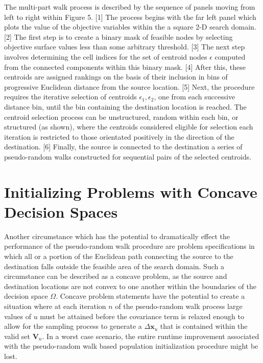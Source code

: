 The multi-part walk process is described by the sequence of panels moving from left to right within Figure 5. [1] The process begins with the far left panel which plots the value of the objective variables within the a square 2-D search domain. [2] The first step is to create a binary mask of feasible nodes by selecting objective surface values less than some arbitrary threshold. [3] The next step involves determining the cell indices for the set of centroid nodes $\epsilon$ computed from the connected components within this binary mask. [4] After this, these centroids are assigned rankings on the basis of their inclusion in bins of progressive Euclidean distance from the source location. [5] Next, the procedure requires the iterative selection of centroids $\epsilon_1, \epsilon_2$, one from each successive distance bin, until the bin containing the destination location is reached. The centroid selection process can be unstructured, random within each bin, or structured (as shown), where the centroids considered eligible for selection each iteration is restricted to those orientated positively in the direction of the destination. [6] Finally, the source is connected to the destination a series of pseudo-random walks constructed for sequential pairs of the selected centroids.
            
\section{Initializing Problems with Concave Decision Spaces}
            
Another circumstance which has the potential to dramatically effect the performance of the pseudo-random walk procedure are problem specifications in which all or a portion of the Euclidean path connecting the source to the destination falls outside the feasible area of the search domain. Such a circumstance can be described as a concave problem, as the source and destination locations are not convex to one another within the boundaries of the decision space $\Omega$. Concave problem statements have the potential to create a situation where at each iteration $n$ of the pseudo-random walk process large values of $u$ must be attained before the covariance term is relaxed enough to allow for the sampling process to generate a $\Delta\textbf{x}_u$ that is contained within the valid set $\textbf{V}_n$. In a worst case scenario, the entire runtime improvement associated with the pseudo-random walk based population initialization procedure might be lost.

